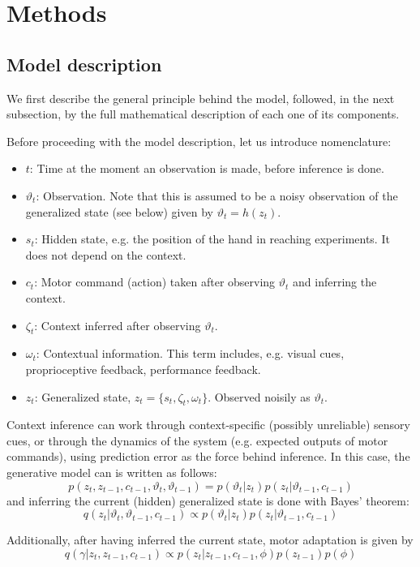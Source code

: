 \documentclass[a4paper,doc,floatsintext,natbib]{apa6}
\begin{document}
\section{Methods}
\subsection{Model description}
\label{subsection:model-description}
We first describe the general principle behind the model, followed, in the next
subsection, by the full mathematical description of each one of its components.

Before proceeding with the model description, let us introduce nomenclature:
\begin{itemize}
\item $t$: Time at the moment an observation is made, before inference is done.
\item $\vartheta_t$: Observation. Note that this is assumed to be a noisy
observation of the generalized state (see below) given by $\vartheta_t = h(z_t)$.
\item $s_t$: Hidden state, e.g. the position of the hand in reaching
experiments. It does not depend on the context.
\item $c_t$: Motor command (action) taken after observing $\vartheta_t$ and inferring the context.
\item $\zeta_t$: Context inferred after observing $\vartheta_t$.
\item $\omega_t$: Contextual information. This term includes, e.g. visual cues,
proprioceptive feedback, performance feedback.
\item $z_t$: Generalized state, $z_t = \{s_t, \zeta_t, \omega_t\}$. Observed noisily
as $\vartheta_t$.
\end{itemize}

Context inference can work through context-specific (possibly unreliable) sensory cues,
or through the dynamics of the system (e.g. expected outputs of motor
commands), using prediction error as the force behind inference. In this case,
the generative model can is written as follows:
\[
p(z_t, z_{t-1}, c_{t-1}, \vartheta_t, \vartheta_{t-1}) = p(\vartheta_t | z_t)p(z_t|\vartheta_{t-1}, c_{t-1})
\]
and inferring the current (hidden) generalized state is done with Bayes' theorem:
\[
  q(z_t | \vartheta_t, \vartheta_{t-1}, c_{t-1}) \propto p(\vartheta_t | z_t)p(z_t|\vartheta_{t-1}, c_{t-1})
\]
  
Additionally, after having inferred the current state, motor adaptation is given by
\[
q(\gamma | z_t, z_{t-1}, c_{t-1}) \propto p(z_t | z_{t-1}, c_{t-1}, \phi)p(z_{t-1})p(\phi)
\]
\end{document}
